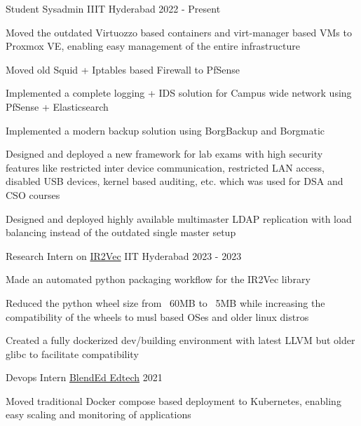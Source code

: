 
\begin{cventries}
	\cventry
	  {Student Sysadmin} %
	  {IIIT Hyderabad} %
	  {} %
	  {2022 - Present} %
	  {
		\begin{cvitems} %
		  \item {Moved the outdated Virtuozzo based containers and virt-manager based VMs to Proxmox VE, enabling easy management of the entire infrastructure}
		  \item {Moved old Squid + Iptables based Firewall to PfSense}
		  \item {Implemented a complete logging + IDS solution for Campus wide network using PfSense + Elasticsearch}
		  \item {Implemented a modern backup solution using BorgBackup and Borgmatic}
		  \item {Designed and deployed a new framework for lab exams with high security features like restricted inter device communication, restricted LAN access, disabled USB devices, kernel based auditing, etc. which was used for DSA and CSO courses}
		  \item {Designed and deployed highly available multimaster LDAP replication with load balancing instead of the outdated single master setup}
		\end{cvitems}
	  }
    
    
	\cventry
    {Research Intern on \href{https://github.com/IITH-Compilers/IR2Vec}{IR2Vec}} %
    {IIT Hyderabad} %
    {} %
    {2023 - 2023} %
    {
      \begin{cvitems} %
        \item {Made an automated python packaging workflow for the IR2Vec library}
        \item {Reduced the python wheel size from ~60MB to ~5MB while increasing the compatibility of the wheels to musl based OSes and older linux distros}
        \item {Created a fully dockerized dev/building environment with latest LLVM but older glibc to facilitate compatibility}
      \end{cvitems}
    }
    
    
  \cventry
    {Devops Intern} %
    {\href{https://blend-ed.org/}{BlendEd Edtech}} %
    {} %
    {2021} %
    {
      \begin{cvitems} %
        \item {Moved traditional Docker compose based deployment to Kubernetes, enabling easy scaling and monitoring of applications}
      \end{cvitems}
    }
    

\end{cventries}
